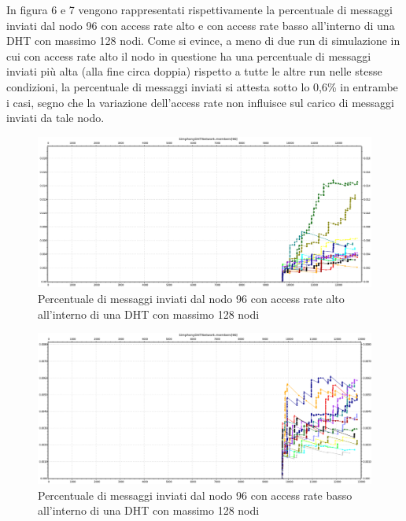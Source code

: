 \documentclass[	
	DIV=calc,
	paper=a4,
	fontsize=11pt,
	onecolumn
]{scrartcl} %
\begin{document}
	In figura 6 e 7 vengono rappresentati rispettivamente la percentuale di messaggi inviati dal nodo 96 con access rate alto e con access rate basso all'interno di una DHT con massimo 128 nodi. Come si evince, a meno di due run di simulazione in cui con access rate alto il nodo in questione ha una percentuale di messaggi inviati più alta (alla fine circa doppia) rispetto a tutte le altre run nelle stesse condizioni, la percentuale di messaggi inviati si attesta sotto lo 0,6\% in entrambe i casi, segno che la variazione dell'access rate non influisce sul carico di messaggi inviati da tale nodo.	
	
	\begin{figure}[H]
		\centering
		\includegraphics[scale=0.35]	{SymphonyDHT/plots/PercentageOfMessagesSent/128_Nodes_FastAccess/SymphonyDHT_128Nodes_FastAccess_Node96.png}
		\caption{Percentuale di messaggi inviati dal nodo 96 con access rate alto all'interno di una DHT con massimo 128 nodi}
		\label{Figura 6}
	\end{figure}
	\begin{figure}[H]
		\centering
		\includegraphics[scale=0.35]	{SymphonyDHT/plots/PercentageOfMessagesSent/128_Nodes_SlowAccess/SymphonyDHT_128Nodes_SlowAccess_Node96.png}
		\caption{Percentuale di messaggi inviati dal nodo 96 con access rate basso all'interno di una DHT con massimo 128 nodi}
		\label{Figura 7}
	\end{figure}
		
\end{document}

